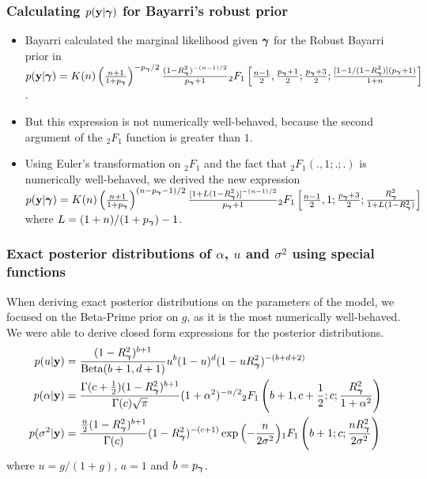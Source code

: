 \documentclass[notes=only]{beamer}
\begin{document}
\begin{frame}
	\frametitle{Calculating $p({\bf y} | {\boldsymbol \gamma})$ for Bayarri's robust prior}
	\begin{itemize}
		\item Bayarri calculated the marginal likelihood given ${\boldsymbol \gamma}$ for the Robust Bayarri prior
		 	in \cite{Bayarri2012} 
			\tiny
			$p({\bf y} | {\boldsymbol \gamma}) = K(n) \left(\frac{n + 1}{1 + p_{\boldsymbol \gamma}}\right)^{-p_{\boldsymbol \gamma}/2} \frac{(1 - R^2_{\boldsymbol \gamma})^{-(n-1)/2}}{p_{\boldsymbol \gamma} + 1} {}_2 F_1 \left[ \frac{n-1}{2}, \frac{p_{\boldsymbol \gamma}+1}{2}; \frac{p_{\boldsymbol \gamma} + 3}{2}; \frac{[1 - 1/(1 - R^2_{\boldsymbol \gamma})](p_{\boldsymbol \gamma} + 1)}{1 + n} \right]$.
		\small
		\item But this expression is not numerically well-behaved, because the second argument of the
					${}_2 F_1$ function is greater than $1$.
		\item Using Euler's transformation on ${}_2 F_1$ and the fact that ${}_2 F_1(., 1; .; .)$ is numerically
					well-behaved, we derived the new expression
			\tiny
			$p({\bf y} | {\boldsymbol \gamma}) = K(n) \left(\frac{n + 1}{1 + p_{\boldsymbol \gamma}}\right)^{(n-p_{\boldsymbol \gamma}-1)/2} \frac{[1 + L (1 - R^2_{\boldsymbol \gamma})]^{-(n-1)/2}}{p_{\boldsymbol \gamma} + 1} {}_2 F_1 \left[ \frac{n-1}{2}, 1; \frac{p_{\boldsymbol \gamma} + 3}{2}; 
			\frac{R^2_{\boldsymbol \gamma}}{1 + L(1 - R^2_{\boldsymbol \gamma})} \right]$ \\
			\small
			where $L = (1 + n)/(1 + p_{\boldsymbol \gamma}) - 1$.
	\end{itemize}
\end{frame}


\begin{frame}
	\frametitle{Exact posterior distributions of $\alpha$, $u$ and $\sigma^2$ using special functions}
	When deriving exact posterior distributions on the parameters of the model,
	we focused on the Beta-Prime prior on $g$, as it is the most numerically well-behaved. \\
	We were able to derive closed form expressions for the posterior distributions.
	\small
	\begin{align*}
		p(u | {\bf y}) &= \frac{(1 - R_{\boldsymbol \gamma}^2)^{b + 1}}{\text{Beta}(b + 1, d + 1)} u^b (1 - u)^d (1 - u R_{\boldsymbol \gamma}^2)^{-(b + d + 2)} \\
		p(\alpha | {\bf y}) &= \frac{\Gamma(c + \frac{1}{2}) (1 - R_{\boldsymbol \gamma}^2)^{b + 1}}{\Gamma(c) \sqrt{\pi}} (1 + \alpha^2)^{-n/2}
		{}_2 F_1 \left(b + 1, c + \frac{1}{2}; c; \frac{R_{\boldsymbol \gamma}^2}{1 + \alpha^2}\right) \\
		p(\sigma^2 | {\bf y}) &= \frac{\frac{n}{2} (1 - R_{\boldsymbol \gamma}^2)^{b + 1}}{\Gamma(c)} (1 - R_{\boldsymbol \gamma}^2)^{-(c + 1)}
												\exp{\left( -\frac{n}{2 \sigma^2} \right)} {}_1 F_1 \left(b + 1; c; \frac{n R_{\boldsymbol \gamma}^2}{2 \sigma^2}\right)
	\end{align*}
	where $u = g/(1 + g)$, $a = 1$ and $b = p_{\boldsymbol \gamma}$.
\end{frame}
\end{document}
